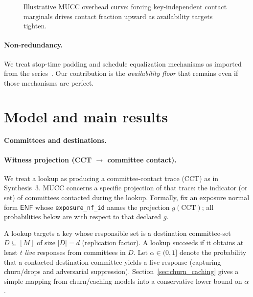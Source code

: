 \documentclass[11pt]{article}
\begin{document}
\begin{figure}[t]
  \centering
  \caption{Illustrative MUCC overhead curve: forcing key-independent contact marginals drives contact fraction upward as availability targets tighten.}
  \label{fig:mucc-overhead}
\end{figure}

\paragraph{Non-redundancy.}
We treat stop-time padding and schedule equalization mechanisms as imported from the series~\cite{series:stoptimeaddendum,series:schedcompiler}.
Our contribution is the \emph{availability floor} that remains even if those mechanisms are perfect.


\section{Model and main results}
\label{sec:model}

\paragraph{Committees and destinations.}

\paragraph{Witness projection (CCT $\rightarrow$ committee contact).}
We treat a lookup as producing a committee-contact trace (CCT) as in Synthesis~3.
MUCC concerns a specific projection of that trace: the indicator (or set) of committees contacted during the lookup.
Formally, fix an exposure normal form \(\mathsf{ENF}\) whose \texttt{exposure\_nf\_id} names the projection \(g(\mathrm{CCT})\); all probabilities below are with respect to that declared \(g\).

A lookup targets a key whose responsible set is a destination committee-set $D\subseteq[M]$ of size $|D|=d$ (replication factor).
A lookup succeeds if it obtains at least $t$ \emph{live} responses from committees in $D$.
Let $\alpha\in(0,1]$ denote the probability that a contacted destination committee yields a live response (capturing churn/drops and adversarial suppression).
Section~\ref{sec:churn_caching} gives a simple mapping from churn/caching models into a conservative lower bound on $\alpha$.
\end{document}
